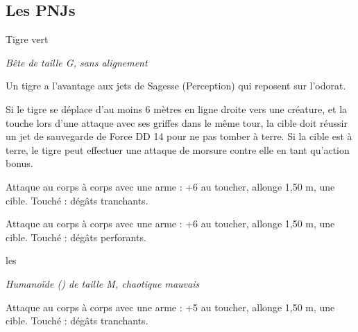 \documentclass[a4paper,10pt,openany]{book}
\begin{document}
\begin{multicols}{2}
\section{Les PNJs}
\begin{monsterbox}{Tigre vert}
	\begin{hangingpar}
		\textit{Bête de taille G, sans alignement}
	\end{hangingpar}
	\dndline%
	\basics[%
	armorclass = 12,
	hitpoints  = \dice{7d10+14},
	speed      = 12 m
	]
	\dndline%
	\stats[
	STR = \stat{18},
	DEX = \stat{14},
	CON = \stat{15},
	INT = \stat{3},
	WIS = \stat{12},
	CHA = \stat{8}
	]
	\dndline%
	\details[%
	skills={Discrétion +6, Perception +3},
	senses=Perception passive 13,
	challenge= 2
	]
	\dndline%
	\begin{monsteraction}
		Un tigre a l’avantage aux jets de Sagesse (Perception) qui reposent sur l’odorat.
	\end{monsteraction}
	\begin{monsteraction}[Bond]
		Si le tigre se déplace d’au moins 6 mètres en ligne droite vers une créature, et la touche lors d’une attaque avec ses griffes dans le même tour, la
		cible doit réussir un jet de sauvegarde de Force DD 14 pour ne pas tomber à terre. Si la cible est à terre, le tigre peut effectuer une attaque de
		morsure contre elle en tant qu’action bonus.
	\end{monsteraction}
	\begin{monsteraction}[Griffes]
		Attaque au corps à corps avec une arme : +6 au toucher, allonge 1,50 m, une cible. Touché :  dégâts tranchants.
	\end{monsteraction}
	\begin{monsteraction}[Morsures]
		Attaque au corps à corps avec une arme : +6 au toucher, allonge 1,50 m, une cible. Touché :  dégâts perforants.
	\end{monsteraction}
\end{monsterbox}

\begin{monsterbox}{les \DemiOrcs}
	\begin{hangingpar}
		\textit{Humanoïde (\DemiOrc) de taille M, chaotique mauvais}
	\end{hangingpar}
	\dndline%
	\basics[%
	armorclass = 13 (armure de peau),
	hitpoints  = \dice{7d10+14},
	speed      = 9 m
	]
	\dndline%
	\stats[
	STR = \stat{16},
	DEX = \stat{12},
	CON = \stat{16},
	INT = \stat{7},
	WIS = \stat{11},
	CHA = \stat{10}
	]
	\dndline%
	\details[%
	skills={Intimidation +2},
	senses={vision dans le noir à 18 m, Perception passive 10},
	languages = {glamhoth, bas-thrain},
	challenge=1/2
	]
	\dndline%
	\begin{monsteraction}
		Attaque au corps à corps avec une arme : +5 au toucher, allonge 1,50 m, une cible. Touché :  dégâts tranchants.
	\end{monsteraction}
\end{monsterbox}


\end{multicols}
\end{document}
